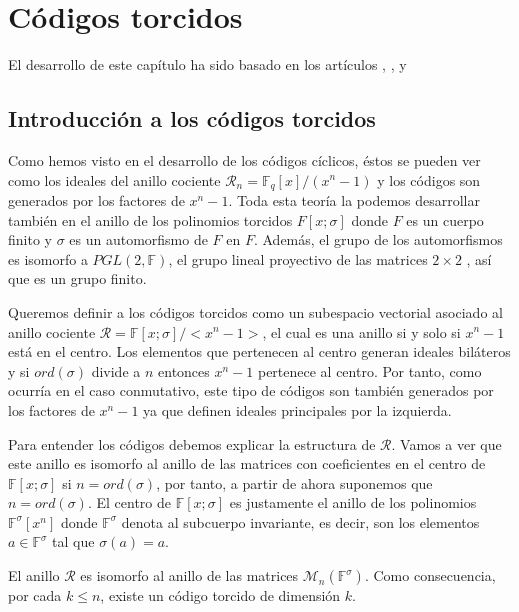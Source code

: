 
\chapter{Códigos torcidos}

El desarrollo de este capítulo ha sido basado en los artículos \cite{GLN2016}, \cite{GLN2017}, \cite{boucher2007skew} y \cite{chaussade2009skew}

\section{Introducción a los códigos torcidos}

Como hemos visto en el desarrollo de los códigos cíclicos, éstos se pueden ver como los ideales del anillo cociente $\mathcal{R}_n = \mathbb{F}_q[x]/(x^n-1)$ y los códigos son generados por los factores de $x^n-1$. Toda esta teoría la podemos desarrollar también en el anillo de los polinomios torcidos $F[x;\sigma]$ donde $F$ es un cuerpo finito y $\sigma$ es un automorfismo de $F$ en $F$. Además, el grupo de los automorfismos es isomorfo a $PGL(2,\mathbb{F})$, el grupo lineal proyectivo de las matrices $2 \times 2$ , así que es un grupo finito.

Queremos definir a los códigos torcidos como un subespacio vectorial asociado al anillo cociente $\mathcal{R}=\mathbb{F}[x;\sigma]/<x^n-1>$, el cual es una anillo si y solo si $x^n-1$ está en el centro. Los elementos que pertenecen al centro generan ideales biláteros y si $ord(\sigma)$ divide a $n$ entonces $x^n-1$ pertenece al centro. Por tanto, como ocurría en el caso conmutativo, este tipo de códigos son también generados por los factores de $x^n-1$ ya que definen ideales principales por la izquierda.

Para entender los códigos debemos explicar la estructura de $\mathcal{R}$. Vamos a ver que este anillo es isomorfo al anillo de las matrices con coeficientes en el centro de $\mathbb{F}[x;\sigma]$ si $n = ord(\sigma)$, por tanto, a partir de ahora suponemos que $n = ord(\sigma)$. El centro de $\mathbb{F}[x;\sigma]$  es justamente el anillo de los polinomios $\mathbb{F}^{\sigma}[x^n]$ donde $\mathbb{F}^{\sigma}$ denota al subcuerpo invariante, es decir, son los elementos $a \in \mathbb{F}^{\sigma} $ tal que $\sigma(a) = a$.

\begin{theorem}
\label{th:isomorfismo_cuerpo_matrices}
El anillo $\mathcal{R}$ es isomorfo al anillo de las matrices $\mathcal{M}_n(\mathbb{F}^{\sigma})$. Como consecuencia, por cada $ k \leq n$, existe un código torcido de dimensión $k$.    
\end{theorem}

